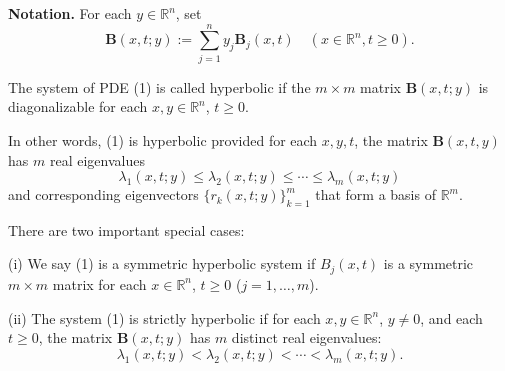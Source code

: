 \noindent\textbf{Notation.} For each $y \in \mathbb{R}^n$, set
\[
\mathbf{B}(x,t;y) := \sum_{j=1}^{n} y_j \mathbf{B}_j(x,t) \quad (x \in \mathbb{R}^n, t \geq 0).
\]

\begin{definition}
\label{def:hyperbolic-system}
The system of PDE (1) is called hyperbolic if the $m \times m$ matrix $\mathbf{B}(x, t; y)$ is diagonalizable for each $x, y \in \mathbb{R}^n$, $t \geq 0$.
\end{definition}

In other words, (1) is hyperbolic provided for each $x, y, t$, the matrix $\mathbf{B}(x, t, y)$ has $m$ real eigenvalues
\[
\lambda_1(x, t; y) \leq \lambda_2(x, t; y) \leq \cdots \leq \lambda_m(x, t; y)
\]
and corresponding eigenvectors $\{r_k(x, t; y)\}_{k=1}^m$ that form a basis of $\mathbb{R}^m$.

There are two important special cases:

\begin{definition}
\label{def:symmetric-strictly-hyperbolic-system}
(i) We say (1) is a symmetric hyperbolic system if $B_j(x, t)$ is a symmetric $m \times m$ matrix for each $x \in \mathbb{R}^n$, $t \geq 0$ ($j = 1, \ldots, m$).

(ii) The system (1) is strictly hyperbolic if for each $x, y \in \mathbb{R}^n$, $y \neq 0$, and each $t \geq 0$, the matrix $\mathbf{B}(x, t; y)$ has $m$ distinct real eigenvalues:
\[
\lambda_1(x, t; y) < \lambda_2(x, t; y) < \cdots < \lambda_m(x, t; y).
\]
\end{definition}

